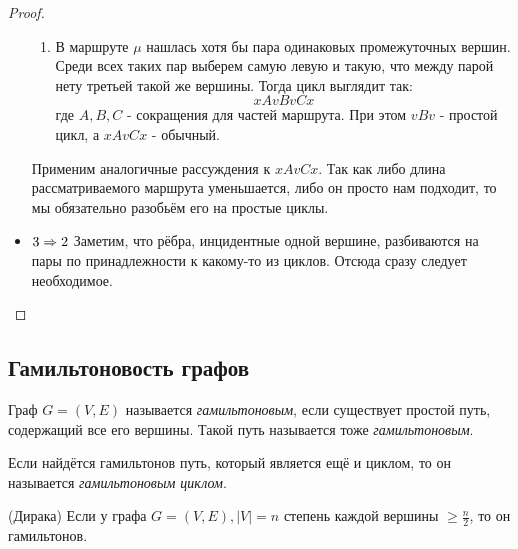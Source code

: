 \begin{proof}
\begin{itemize}
\begin{enumerate}
			\item В маршруте $\mu$ нашлась хотя бы пара одинаковых промежуточных вершин. Среди всех таких пар выберем самую левую и такую, что между парой нету третьей такой же вершины. Тогда цикл выглядит так:
			\[
				xAvBvCx
			\]
			где $A, B, C$ - сокращения для частей маршрута. При этом $vBv$ - простой цикл, а $xAvCx$ - обычный.
		\end{enumerate}
		Применим аналогичные рассуждения к $xAvCx$. Так как либо длина рассматриваемого маршрута уменьшается, либо он просто нам подходит, то мы обязательно разобьём его на простые циклы.
		
		\item $3 \Rightarrow 2$ Заметим, что рёбра, инцидентные одной вершине, разбиваются на пары по принадлежности к какому-то из циклов. Отсюда сразу следует необходимое.
	\end{itemize}
\end{proof}

\subsection{Гамильтоновость графов}

\begin{definition}
	Граф $G = (V, E)$ называется \textit{гамильтоновым}, если существует простой путь, содержащий все его вершины. Такой путь называется тоже \textit{гамильтоновым}.
\end{definition}

\begin{definition}
	Если найдётся гамильтонов путь, который является ещё и циклом, то он называется \textit{гамильтоновым циклом}.
\end{definition}

\begin{theorem} (Дирака)
	Если у графа $G = (V, E), |V| = n$ степень каждой вершины $\ge \frac{n}{2}$, то он гамильтонов.
\end{theorem}


